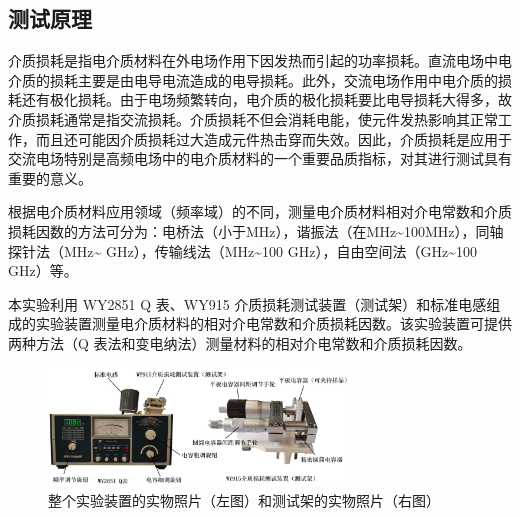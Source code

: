     \subsection{测试原理}
        介质损耗是指电介质材料在外电场作用下因发热而引起的功率损耗。直流电场中电介质的损耗主要是由电导电流造成的电导损耗。此外，交流电场作用中电介质的损耗还有极化损耗。由于电场频繁转向，电介质的极化损耗要比电导损耗大得多，故介质损耗通常是指交流损耗。介质损耗不但会消耗电能，使元件发热影响其正常工作，而且还可能因介质损耗过大造成元件热击穿而失效。因此，介质损耗是应用于交流电场特别是高频电场中的电介质材料的一个重要品质指标，对其进行测试具有重要的意义。\par
        根据电介质材料应用领域（频率域）的不同，测量电介质材料相对介电常数和介质损耗因数的方法可分为：电桥法（小于\unit{\mega\hertz}），谐振法（在\unit{\mega\hertz}\~{}100\unit{\mega\hertz}），同轴探针法（\unit{\mega\hertz}\~{} \unit{\giga\hertz}），传输线法（\unit{\mega\hertz}\~{}100 \unit{\giga\hertz}），自由空间法（\unit{\giga\hertz}\~{}100 \unit{\giga\hertz}）等。\par
        本实验利用 WY2851 Q 表、WY915 介质损耗测试装置（测试架）和标准电感组成的实验装置测量电介质材料的相对介电常数和介质损耗因数。该实验装置可提供两种方法（Q 表法和变电纳法）测量材料的相对介电常数和介质损耗因数。
        \begin{figure}[!ht]\centering
            \includegraphics[width=80mm]{img/A12/fg3.jpg}
            \caption{整个实验装置的实物照片（左图）和测试架的实物照片（右图）\label{fig:A12.3}}
        \end{figure}
